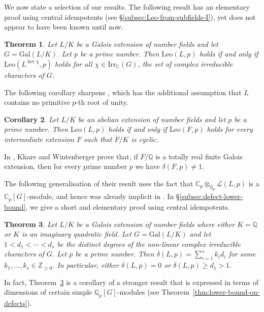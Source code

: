 \documentclass[12pt]{amsart}
\theoremstyle{plain}
\newtheorem{theorem}{Theorem}[section]
\newtheorem{corollary}[theorem]{Corollary}
\theoremstyle{remark}
\theoremstyle{definition}
\newcommand{\Z}{\mathbb{Z}}
\newcommand{\Q}{\mathbb{Q}}
\newcommand{\C}{\mathbb{C}}
\newcommand{\Gal}{\mathrm{Gal}}
\newcommand{\Irr}{\mathrm{Irr}}
\newcommand{\Leo}{\mathrm{Leo}}
\numberwithin{equation}{section}
\begin{document}
We now state a selection of our results. 
The following result has an elementary proof using central idempotents (see \S \ref{subsec:Leo-from-subfields-I}), 
yet does not appear to have been known until now.

\begin{theorem}\label{thm:nonfaithfulintro}
Let $L/K$ be a Galois extension of number fields and let $G=\Gal(L/K)$.
Let $p$ be a prime number.
Then
$\Leo(L,p)$ holds if and only if $\Leo(L^{\ker\chi},p)$ holds for all $\chi \in \Irr_{\C}(G)$,
the set of complex irreducible characters of $G$.
\end{theorem}

The following corollary sharpens \cite[Lemma 3.1]{MR1190214}, which 
has the additional assumption that $L$ contains no primitive $p$-th  root of unity.

\begin{corollary}\label{cor:intro-leopoldt-abelian-to-cyclic}
Let $L/K$ be an abelian extension of number fields and let $p$ be a prime number.
Then $\Leo(L,p)$ holds if and only if $\Leo(F,p)$ holds for every intermediate extension $F$
such that $F/K$ is cyclic.
\end{corollary}

In \cite[Proposition A.1]{MR3158531}, Khare and Wintenberger prove that, 
if $F/\Q$ is a totally real finite Galois extension, then for every prime number 
$p$ we have $\delta(F,p) \neq 1$. 

The following generalisation of their result
uses the fact that $\C_{p} \otimes_{\Q_{p}} \mathcal{L}(L,p)$ is a $\C_{p}[G]$-module, 
and hence was already implicit in \cite{MR659620,MR769790,MR1004134,MR1087978}.
In \S \ref{subsec:defect-lower-bound}, we give a short and elementary proof using central idempotents.

\begin{theorem}\label{thm:intro-lower-bound-on-defects}
Let $L/K$ be a Galois extension of number fields where either
$K=\Q$ or $K$ is an imaginary quadratic field.
Let $G=\Gal(L/K)$ and let $1 < d _{1} < \cdots < d_{s}$ be the distinct degrees of the non-linear complex irreducible characters of $G$.
Let $p$ be a prime number. 
Then $\delta(L,p)=\sum_{i=1}^{s} k_{i}d_{i}$ for some $k_{1}, \ldots, k_{s} \in \Z_{\geq 0}$.
In particular, either $\delta(L,p)=0$ or $\delta(L,p) \geq d_{1}>1$.
\end{theorem}

In fact, Theorem~\ref{thm:intro-lower-bound-on-defects} is a corollary of a
stronger result that is expressed in terms of dimensions of certain simple $\Q_{p}[G]$-modules
(see Theorem~\ref{thm:lower-bound-on-defects}).
\end{document}
